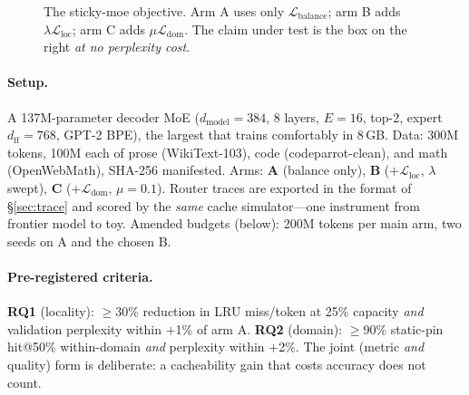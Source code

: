 \documentclass[11pt]{article}
\begin{document}
\begin{figure}[t]\centering
{}
\caption{The sticky-moe objective. Arm A uses only $\mathcal{L}_{\text{balance}}$;
arm B adds $\lambda\mathcal{L}_{\text{loc}}$; arm C adds
$\mu\mathcal{L}_{\text{dom}}$. The claim under test is the box on the right
\emph{at no perplexity cost}.}
\label{fig:obj}
\end{figure}

\paragraph{Setup.} A 137M-parameter decoder MoE ($d_{\text{model}}{=}384$, 8
layers, $E{=}16$, top-2, expert $d_{\text{ff}}{=}768$, GPT-2 BPE), the largest
that trains comfortably in 8\,GB. Data: 300M tokens, 100M each of prose
(WikiText-103), code (codeparrot-clean), and math (OpenWebMath), SHA-256
manifested. Arms: \textbf{A} (balance only), \textbf{B} ($+\mathcal{L}_{\text{loc}}$,
$\lambda$ swept), \textbf{C} ($+\mathcal{L}_{\text{dom}}$, $\mu{=}0.1$). Router
traces are exported in the format of \S\ref{sec:trace} and scored by the
\emph{same} cache simulator---one instrument from frontier model to toy. Amended
budgets (below): 200M tokens per main arm, two seeds on A and the chosen B.

\paragraph{Pre-registered criteria.}
\textbf{RQ1} (locality): $\ge$30\% reduction in LRU miss/token at 25\% capacity
\emph{and} validation perplexity within $+$1\% of arm A. \textbf{RQ2} (domain):
$\ge$90\% static-pin hit@50\% within-domain \emph{and} perplexity within $+$2\%.
The joint (metric \emph{and} quality) form is deliberate: a cacheability gain
that costs accuracy does not count.
\end{document}
